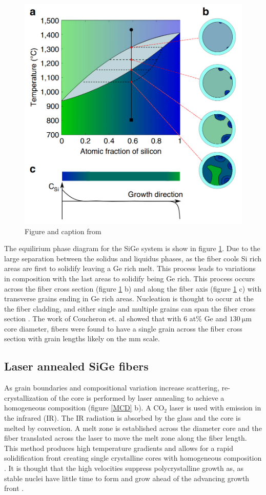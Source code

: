 \begin{figure}[t]
    \centering
    \includegraphics[width=.7\textwidth]{fig/intro-background/coucheron.png}
    \caption{Figure and caption from \cite{Coucheron2016}}
    \label{sige_phase}
\end{figure}
The equilirium phase diagram for the SiGe system is show in figure \ref{sige_phase}. Due to the large separation between the solidus and liquidus phases, as the fiber cools Si rich areas are first to solidify leaving a Ge rich melt. This process leads to variations in composition with the last areas to solidify being Ge rich. This process occurs across the fiber cross section (figure \ref{sige_phase} b) and along the fiber axis (figure \ref{sige_phase} c) with transverse grains ending in Ge rich areas. Nucleation is thought to occur at the the fiber cladding, and either single and multiple grains can span the fiber cross section \cite{Coucheron2016}. The work of Coucheron et. al \cite{Coucheron2016} showed that with  6 at\% Ge and $\SI{130}{\micro\meter}$ core diameter, fibers were found to have a single grain across the fiber cross section with grain lengths likely on the $\si{\mm}$ scale. 

\subsection{Laser annealed SiGe fibers}
As grain boundaries and compositional variation increase scattering, re-crystallization of the core is performed by laser annealing to achieve a homogeneous composition (figure \ref{MCD} b). A $\text{CO}_2$ laser is used with emission in the infrared (IR). The IR radiation is absorbed by the glass and the core is melted by convection. A melt zone is established across the diameter core and the fiber translated across the laser to move the melt zone along the fiber length. This method produces high temperature gradients and allows for a rapid solidification front creating single crystalline cores with homogeneous composition \cite{Coucheron2016}. It is thought that the high velocities suppress polycrystalline growth as, as stable nuclei have little time to form and grow ahead of the advancing growth front \cite{Coucheron2016}.  



